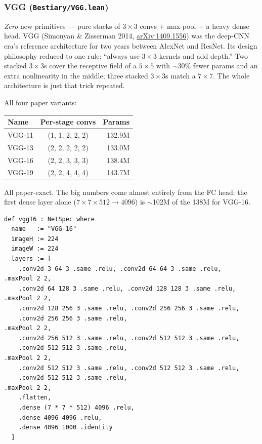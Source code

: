 \subsubsection*{VGG (\texttt{Bestiary/VGG.lean})}
\emph{Zero} new primitives --- pure stacks of $3\times 3$ convs +
max-pool + a heavy dense head. VGG (Simonyan \& Zisserman 2014,
\href{https://arxiv.org/abs/1409.1556}{arXiv:1409.1556}) was the
deep-CNN era's reference architecture for two years between AlexNet
and ResNet. Its design philosophy reduced to one rule: ``always use
$3\times 3$ kernels and add depth.'' Two stacked $3\times 3$s cover
the receptive field of a $5\times 5$ with $\sim$30\% fewer params
and an extra nonlinearity in the middle; three stacked $3\times 3$s
match a $7\times 7$. The whole architecture is just that
trick repeated.

All four paper variants:

\begin{center}
\begin{tabular}{l c r}
\hline
Name    & Per-stage convs    & Params \\
\hline
VGG-11  & (1, 1, 2, 2, 2)    & 132.9M \\
VGG-13  & (2, 2, 2, 2, 2)    & 133.0M \\
VGG-16  & (2, 2, 3, 3, 3)    & 138.4M \\
VGG-19  & (2, 2, 4, 4, 4)    & 143.7M \\
\hline
\end{tabular}
\end{center}

All paper-exact. The big numbers come almost entirely from the FC
head: the first dense layer alone ($7\times 7\times 512 \to 4096$)
is $\sim$102M of the 138M for VGG-16.

\begin{verbatim}
def vgg16 : NetSpec where
  name   := "VGG-16"
  imageH := 224
  imageW := 224
  layers := [
    .conv2d 3 64 3 .same .relu, .conv2d 64 64 3 .same .relu,    .maxPool 2 2,
    .conv2d 64 128 3 .same .relu, .conv2d 128 128 3 .same .relu, .maxPool 2 2,
    .conv2d 128 256 3 .same .relu, .conv2d 256 256 3 .same .relu,
    .conv2d 256 256 3 .same .relu,                              .maxPool 2 2,
    .conv2d 256 512 3 .same .relu, .conv2d 512 512 3 .same .relu,
    .conv2d 512 512 3 .same .relu,                              .maxPool 2 2,
    .conv2d 512 512 3 .same .relu, .conv2d 512 512 3 .same .relu,
    .conv2d 512 512 3 .same .relu,                              .maxPool 2 2,
    .flatten,
    .dense (7 * 7 * 512) 4096 .relu,
    .dense 4096 4096 .relu,
    .dense 4096 1000 .identity
  ]
\end{verbatim}

